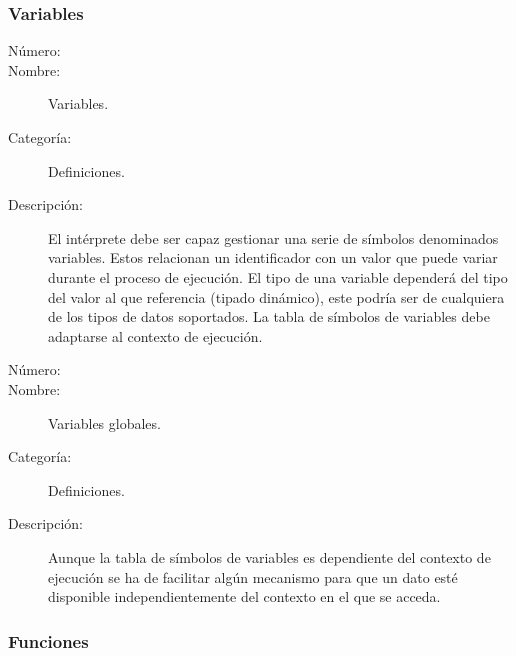 \subsubsection{Variables}
\begin{framed}
	\begin{description}
		\item [Número:] \cn
		\item [Nombre:] Variables.
		\item [Categoría:] Definiciones.
		\item [Descripción:] El intérprete debe ser capaz gestionar una serie de símbolos
		denominados variables. Estos relacionan un identificador con un valor que puede variar durante el proceso de ejecución. El tipo
		de una variable dependerá del tipo del valor al que referencia (tipado dinámico), este podría ser de cualquiera de los tipos de
		datos soportados. La tabla de símbolos de variables debe adaptarse al contexto de ejecución.
	\end {description}
\end{framed}

\begin{framed}
	\begin{description}
		\item [Número:] \cn
		\item [Nombre:] Variables globales.
		\item [Categoría:] Definiciones.
		\item [Descripción:] Aunque la tabla de símbolos de variables es dependiente del contexto de ejecución se
		ha de facilitar algún mecanismo para que un dato esté disponible independientemente del contexto en el que
		se acceda.
	\end {description}
\end{framed}

\subsubsection{Funciones}

